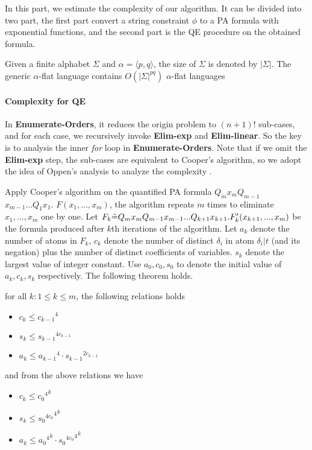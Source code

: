 In this part, we estimate the complexity of our algorithm.
It can be divided into two part, 
the first part convert a string constraint $\phi$ to a PA formula with exponential functions,
and the second part is the QE procedure on the obtained formula.

Given a finite alphabet $\Sigma$ and $\alpha=\langle p,q \rangle$, the size of $\Sigma$ is denoted by
$|\Sigma|$. 
The generic $\alpha$-flat language contains $O(|\Sigma|^{pq})$ $\alpha$-flat languages


\paragraph{Complexity for QE}
In \textbf{Enumerate-Orders},
it reduces the origin problem to $(n+1)!$ sub-cases,
and for each case,
we recursively invoke \textbf{Elim-exp} and \textbf{Elim-linear}.
So the key is to analysis the inner \textit{for}
loop in \textbf{Enumerate-Orders}.
Note that if we omit the \textbf{Elim-exp} step,
the sub-cases are equivalent to Cooper's algorithm,
so we adopt the idea of Oppen's analysis to analyze the complexity
\cite{Oppen}.


Apply Cooper's algorithm on the quantified PA formula 
$Q_m x_m Q_{m-1}$ 
$x_{m-1} ... Q_1 x_1. $
$F(x_1,...,x_m)$,
the algorithm repeats $m$ times to eliminate
$x_1,...,x_m$ one by one.
Let $F_k \hat{=} Q_m x_m Q_{m-1} 
x_{m-1} ... Q_{k+1} x_{k+1}. F_k'(x_{k+1},...,x_m)$
be the formula produced after $k$th iterations of the algorithm. 
Let $a_k$ denote the number of atoms in $F_k$,
$c_k$ denote the number of distinct $\delta_i$ in atom $\delta_i | t$ (and its negation) plus the number of distinct coefficients of variables.
$s_k$ denote the largest value of integer constant.
Use $a_0,c_0,s_0$ to denote the initial value of $a_k,c_k,s_k$ respectively.
The following theorem holds.

\begin{theorem}
for all $k: 1\le k\le m$, the following relations holds
\begin{itemize}
    \item $c_k \le {c_{k-1}}^4$
    \item $s_k \le {s_{k-1}}^{4c_{k-1}}$
    \item $a_k \le {a_{k-1}}^4 \cdot {s_{k-1}}^{2c_{k-1}}$
\end{itemize}
and from the above relations we have 
\begin{itemize}
    \item $c_k \le {{c_0}^4}^k$
    \item $s_k \le {{{s_0}^{4c_0}}^4}^k$
    \item $a_k \le {{a_0}^4}^k \cdot {{{s_0}^{4c_0}}^4}^k$
\end{itemize}
\end{theorem}

